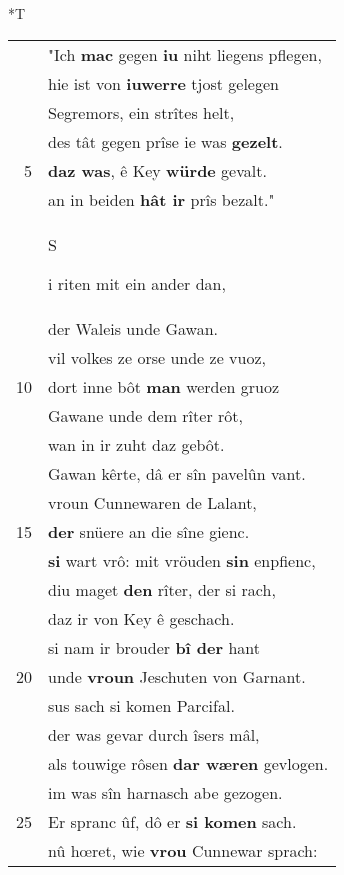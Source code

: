 \documentclass[8pt,a4paper,notitlepage]{article}
\begin{document}
\begin{table}[ht]
\begin{minipage}[t]{0.5\linewidth}
\end{minipage}
\hspace{0.5cm}
\begin{minipage}[t]{0.5\linewidth}
\small
\begin{center}*T
\end{center}
\begin{tabular}{rl}
 & "Ich \textbf{mac} gegen \textbf{iu} niht liegens pflegen,\\ 
 & hie ist von \textbf{iuwerre} tjost gelegen\\ 
 & Segremors, ein strîtes helt,\\ 
 & des tât gegen prîse ie was \textbf{gezelt}.\\ 
5 & \textbf{daz was}, ê Key \textbf{würde} gevalt.\\ 
 & an in beiden \textbf{hât ir} prîs bezalt."\\ 
 & \begin{large}S\end{large}i riten mit ein ander dan,\\ 
 & der Waleis unde Gawan.\\ 
 & vil volkes ze orse unde ze vuoz,\\ 
10 & dort inne bôt \textbf{man} werden gruoz\\ 
 & Gawane unde dem rîter rôt,\\ 
 & wan in ir zuht daz gebôt.\\ 
 & Gawan kêrte, dâ er sîn pavelûn vant.\\ 
 & vroun Cunnewaren de Lalant,\\ 
15 & \textbf{der} snüere an die sîne gienc.\\ 
 & \textbf{si} wart vrô: mit vröuden \textbf{si}\textbf{n} enpfienc,\\ 
 & diu maget \textbf{den} rîter, der si rach,\\ 
 & daz ir von Key ê geschach.\\ 
 & si nam ir brouder \textbf{bî der} hant\\ 
20 & unde \textbf{vroun} Jeschuten von Garnant.\\ 
 & sus sach si komen Parcifal.\\ 
 & der was gevar durch îsers mâl,\\ 
 & als touwige rôsen \textbf{dar wæren} gevlogen.\\ 
 & im was sîn harnasch abe gezogen.\\ 
25 & Er spranc ûf, dô er \textbf{si komen} sach.\\ 
 & nû hœret, wie \textbf{vrou} Cunnewar sprach:\\ 

\end{tabular}
\end{minipage}
\end{table}
\end{document}
